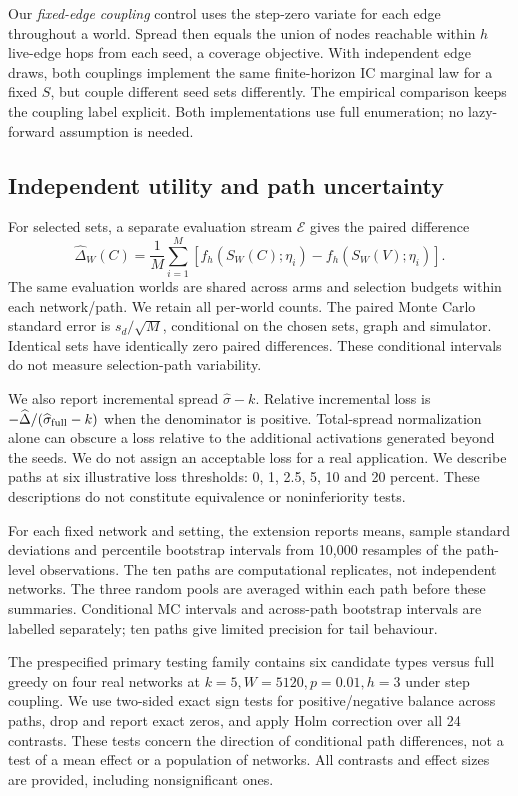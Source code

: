 Our \emph{fixed-edge coupling} control uses the step-zero variate for each edge throughout a world. Spread then equals the union of nodes reachable within $h$ live-edge hops from each seed, a coverage objective. With independent edge draws, both couplings implement the same finite-horizon IC marginal law for a fixed $S$, but couple different seed sets differently. The empirical comparison keeps the coupling label explicit. Both implementations use full enumeration; no lazy-forward assumption is needed.

\subsection{Independent utility and path uncertainty}
For selected sets, a separate evaluation stream $\mathcal E$ gives the paired difference
\begin{equation}
\widehat\Delta_W(C)=\frac{1}{M}\sum_{i=1}^{M}
\left[f_h(S_W(C);\eta_i)-f_h(S_W(V);\eta_i)\right].
\end{equation}
The same evaluation worlds are shared across arms and selection budgets within each network/path. We retain all per-world counts. The paired Monte Carlo standard error is $s_d/\sqrt M$, conditional on the chosen sets, graph and simulator. Identical sets have identically zero paired differences. These conditional intervals do not measure selection-path variability.

We also report incremental spread $\widehat\sigma-k$. Relative incremental loss is $-\widehat\Delta/(\widehat\sigma_{\rm full}-k)$ when the denominator is positive. Total-spread normalization alone can obscure a loss relative to the additional activations generated beyond the seeds. We do not assign an acceptable loss for a real application. We describe paths at six illustrative loss thresholds: 0, 1, 2.5, 5, 10 and 20 percent. These descriptions do not constitute equivalence or noninferiority tests.

For each fixed network and setting, the extension reports means, sample standard deviations and percentile bootstrap intervals from 10,000 resamples of the path-level observations. The ten paths are computational replicates, not independent networks. The three random pools are averaged within each path before these summaries. Conditional MC intervals and across-path bootstrap intervals are labelled separately; ten paths give limited precision for tail behaviour.

The prespecified primary testing family contains six candidate types versus full greedy on four real networks at $k=5,W=5120,p=0.01,h=3$ under step coupling. We use two-sided exact sign tests for positive/negative balance across paths, drop and report exact zeros, and apply Holm correction over all 24 contrasts. These tests concern the direction of conditional path differences, not a test of a mean effect or a population of networks. All contrasts and effect sizes are provided, including nonsignificant ones.

